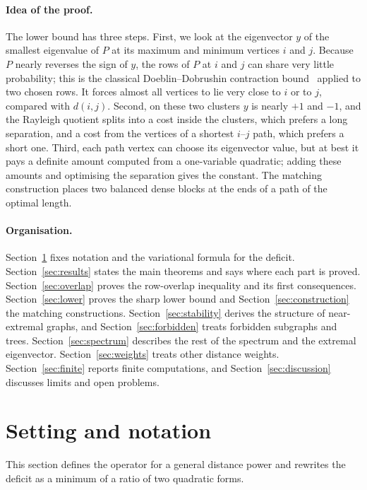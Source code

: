 \documentclass[11pt,a4paper]{article}
\theoremstyle{definition}
\begin{document}
\paragraph{Idea of the proof.}
The lower bound has three steps. First, we look at the eigenvector $y$ of the smallest eigenvalue of $P$ at its maximum and minimum vertices $i$ and $j$. Because $P$ nearly reverses the sign of $y$, the rows of $P$ at $i$ and $j$ can share very little probability; this is the classical Doeblin--Dobrushin contraction bound~\cite{gq} applied to two chosen rows. It forces almost all vertices to lie very close to $i$ or to $j$, compared with $d(i,j)$. Second, on these two clusters $y$ is nearly $+1$ and $-1$, and the Rayleigh quotient splits into a cost inside the clusters, which prefers a long separation, and a cost from the vertices of a shortest $i$--$j$ path, which prefers a short one. Third, each path vertex can choose its eigenvector value, but at best it pays a definite amount computed from a one-variable quadratic; adding these amounts and optimising the separation gives the constant. The matching construction places two balanced dense blocks at the ends of a path of the optimal length.

\paragraph{Organisation.}
Section~\ref{sec:setting} fixes notation and the variational formula for the deficit. Section~\ref{sec:results} states the main theorems and says where each part is proved. Section~\ref{sec:overlap} proves the row-overlap inequality and its first consequences. Section~\ref{sec:lower} proves the sharp lower bound and Section~\ref{sec:construction} the matching constructions. Section~\ref{sec:stability} derives the structure of near-extremal graphs, and Section~\ref{sec:forbidden} treats forbidden subgraphs and trees. Section~\ref{sec:spectrum} describes the rest of the spectrum and the extremal eigenvector. Section~\ref{sec:weights} treats other distance weights. Section~\ref{sec:finite} reports finite computations, and Section~\ref{sec:discussion} discusses limits and open problems.

\section{Setting and notation}\label{sec:setting}
This section defines the operator for a general distance power and rewrites the deficit as a minimum of a ratio of two quadratic forms.
\end{document}
